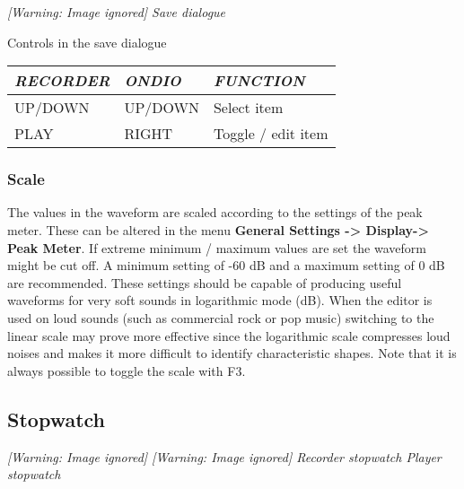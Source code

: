 {\centering\itshape
  [Warning: Image ignored] %
 \newline
Save dialogue
\par}

Controls in the save dialogue
\begin{tabular}[c]{|p{2.62cm}|p{2.266cm}|p{3.965cm}|}
\hline
{\centering\bfseries\itshape
RECORDER 
\par}
&
{\centering\bfseries\itshape
ONDIO 
\par}
&
{\centering\bfseries\itshape
FUNCTION 
\par}
\\\hline
{\centering
UP/DOWN 
\par}
&
{\centering
UP/DOWN 
\par}
&
Select item 
\\\hline
{\centering
PLAY 
\par}
&
{\centering
RIGHT 
\par}
&
Toggle / edit item 
\\\hline
\end{tabular}

\subsubsection{Scale}
The values in the waveform are scaled according to the settings of the
peak meter. These can be altered in the menu
\textbf{General Settings {}-{\textgreater} Display{}-{\textgreater} Peak Meter}. If extreme minimum /
maximum values are set the waveform might be cut off.  A minimum
setting of {}-60 dB and a maximum setting of 0 dB are recommended.
These settings should be capable of producing useful waveforms for very
soft sounds in logarithmic mode (dB). When the editor is used on loud
sounds (such as commercial rock or pop music) switching to the linear
scale may prove more effective since the logarithmic scale compresses
loud noises and makes it more difficult to identify characteristic
shapes. Note that it is always possible to toggle the scale with F3. 

\subsection{Stopwatch}
{\centering\itshape
  [Warning: Image ignored] %
 \textmd{  }  [Warning: Image ignored]
 \newline
Recorder stopwatch  Player stopwatch  
\par}

